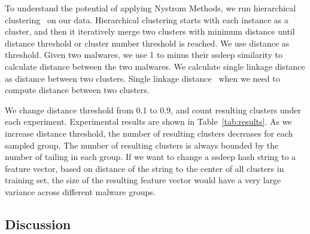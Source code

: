 To understand the potential of applying Nystrom Methods, we run hierarchical clustering~\cite{hcluster} on our data.
Hierarchical clustering starts with each instance as a cluster, 
and then it iteratively merge two clusters with minimum distance 
until distance threshold or cluster number threshold is reached. 
We use distance as threshold. 
Given two malwares, 
we use 1 to minus their ssdeep similarity to calculate distance between the two malwares. 
We calculate single linkage distance as distance between two clusters. 
Single linkage
distance~\cite{single-link} when we need to compute distance between two clusters. 

We change distance threshold from 0.1 to 0.9, 
and count resulting clusters under each experiment. 
Experimental results are shown in Table~\ref{tab:results}. 
As we increase distance threshold, the number of resulting clusters decreases for each sampled group. 
The number of resulting clusters is always bounded by the number of tailing in each group. 
If we want to change a ssdeep hash string to a feature vector, 
based on distance of the string to the center of all clusters in training set, 
the size of the resulting feature vector would have a very large variance across different malware groups. 




\subsection{Discussion}






